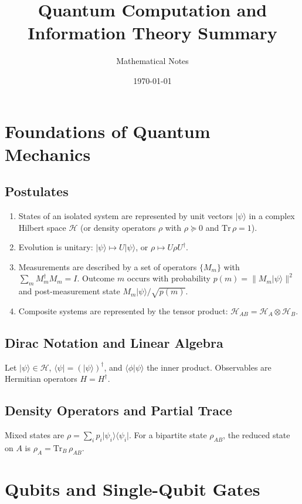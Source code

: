 \documentclass[11pt]{article}
\title{Quantum Computation and Information Theory Summary}
\author{Mathematical Notes}
\date{\today}
\theoremstyle{definition}
\newcommand{\ket}[1]{\lvert #1 \rangle}
\newcommand{\bra}[1]{\langle #1 \rvert}
\newcommand{\braket}[2]{\langle #1 \vert #2 \rangle}
\newcommand{\Tr}{\mathrm{Tr}}
\begin{document}
\maketitle

\tableofcontents
\newpage

\section{Foundations of Quantum Mechanics}

\subsection{Postulates}
\begin{enumerate}
    \item States of an isolated system are represented by unit vectors $\ket{\psi}$ in a complex Hilbert space $\mathcal{H}$ (or density operators $\rho$ with $\rho \succeq 0$ and $\Tr\,\rho = 1$).
    \item Evolution is unitary: $\ket{\psi} \mapsto U\ket{\psi}$, or $\rho \mapsto U\rho U^{\dagger}$.
    \item Measurements are described by a set of operators $\{M_m\}$ with $\sum_m M_m^{\dagger}M_m = I$. Outcome $m$ occurs with probability $p(m)=\lVert M_m\ket{\psi}\rVert^2$ and post-measurement state $M_m\ket{\psi}/\sqrt{p(m)}$.
    \item Composite systems are represented by the tensor product: $\mathcal{H}_{AB} = \mathcal{H}_A \otimes \mathcal{H}_B$.
\end{enumerate}

\subsection{Dirac Notation and Linear Algebra}
Let $\ket{\psi} \in \mathcal{H}$, $\bra{\psi} = (\ket{\psi})^{\dagger}$, and $\braket{\phi}{\psi}$ the inner product. Observables are Hermitian operators $H = H^{\dagger}$.

\subsection{Density Operators and Partial Trace}
Mixed states are $\rho = \sum_i p_i \ket{\psi_i}\!\bra{\psi_i}$. For a bipartite state $\rho_{AB}$, the reduced state on $A$ is $\rho_A = \Tr_B\,\rho_{AB}$.

\section{Qubits and Single-Qubit Gates}
\end{document}
